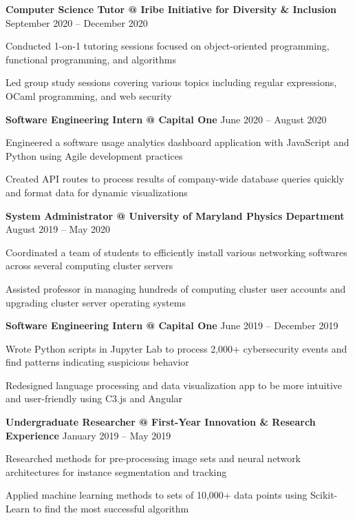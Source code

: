 \documentclass{article}
\newcommand{\employer}[4]{{
\vspace*{2pt}%
\textbf{#1} #2 \hfill #3\\ #4 \vspace*{2pt}}
}
\renewcommand{\labelitemii}{
$\vcenter{\hbox{\tiny$\bullet$}}$\hspace*{-3pt}
}
\newenvironment{bullet-list-minor}{
\begin{list}{\labelitemii}{\setlength\leftmargin{15pt} 
\topsep 0pt \itemsep -2pt}}{\vspace*{4pt}\end{list}
}
\begin{document}
    \employer{Computer Science Tutor @ Iribe Initiative for Diversity \& Inclusion}{}{September 2020 -- December 2020}{}
	\begin{bullet-list-minor}
	\item Conducted 1-on-1 tutoring sessions focused on object-oriented programming, functional programming, and algorithms
    \item Led group study sessions covering various topics including regular expressions, OCaml programming, and web security
    \end{bullet-list-minor}
    \smallskip
    \employer{Software Engineering Intern @ Capital One}{}{June 2020 -- August 2020}{}
	\begin{bullet-list-minor}
	\item Engineered a software usage analytics dashboard application with JavaScript and Python using Agile development practices
	\item Created API routes to process results of company-wide database queries quickly and format data for dynamic visualizations
    \end{bullet-list-minor}
    \smallskip
    \employer{System Administrator @ University of Maryland Physics Department}{}{August 2019 -- May 2020}{}
	\begin{bullet-list-minor}
	\item Coordinated a team of students to efficiently install various networking softwares across several computing cluster servers
	\item Assisted professor in managing hundreds of computing cluster user accounts and upgrading cluster server operating systems
    \end{bullet-list-minor}
    \smallskip  
    \employer{Software Engineering Intern @ Capital One}{}{June 2019 -- December 2019}{}
	\begin{bullet-list-minor}
	\item Wrote Python scripts in Jupyter Lab to process 2,000+  cybersecurity events and find patterns indicating suspicious behavior
	\item Redesigned language processing and data visualization app to be more intuitive and user-friendly using C3.js and Angular
    \end{bullet-list-minor}
    \smallskip    
    \employer{Undergraduate Researcher @ First-Year Innovation \& Research Experience}{}{January 2019 -- May 2019}{}
	\begin{bullet-list-minor}
	\item Researched methods for pre-processing image sets and neural network architectures for instance segmentation and tracking
	\item Applied machine learning methods to sets of 10,000+ data points using Scikit-Learn to find the most successful algorithm
    \end{bullet-list-minor}
\end{document}

